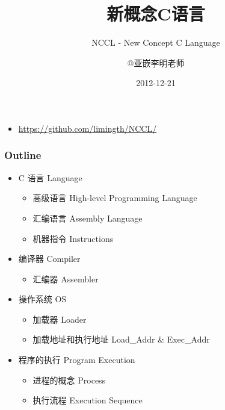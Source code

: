 \documentclass[t]{beamer}
\title{新概念C语言}
\subtitle{NCCL - New Concept C Language}
\author{@亚嵌李明老师}
\institute{limingth@gmail.com}
\date{2012-12-21}
\begin{document}
\begin{frame}
\titlepage
\begin{itemize}
\item 	\url{https://github.com/limingth/NCCL/}
\end{itemize}
\end{frame}

\begin{frame}
\frametitle{Outline}
\begin{itemize}
\item C 语言 Language   
	\begin{itemize}
	\item  
        高级语言 High-level Programming Language
	\item 
        汇编语言 Assembly Language
	\item 
        机器指令 Instructions
	\end{itemize}

\item 编译器 Compiler  
	\begin{itemize}  
	\item  
        汇编器 Assembler
	\end{itemize}
\item 操作系统 OS
	\begin{itemize}
	\item  
        加载器 Loader
	\item  
        加载地址和执行地址 Load_Addr & Exec_Addr
	\end{itemize}
\item 程序的执行 Program Execution
	\begin{itemize}
	\item  
        进程的概念 Process
	\item  
        执行流程 Execution Sequence
	\end{itemize}
\end{itemize}
\tableofcontents[currentsection]
\end{frame}



\end{document}
